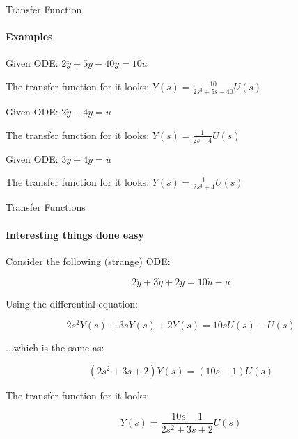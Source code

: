 \documentclass{beamer}
\begin{document}
\begin{frame}{Transfer Function}
\framesubtitle{Examples}
\begin{flushleft}

\begin{example}
Given ODE: $2 \dddot y + 5\dot y - 40 y = 10 u$

The transfer function for it looks: 
$Y(s)  = \frac{10}{2 s^3 + 5 s - 40} U(s)$
\end{example}


\begin{example}
Given ODE: $2 \dot y - 4 y = u$

The transfer function for it looks: $Y(s) = \frac{1}{2 s - 4} U(s)$
\end{example}


\begin{example}
Given ODE: $3 \dddot y + 4y = u$

The transfer function for it looks: $Y(s) = \frac{1}{2 s^3 + 4} U(s)$
\end{example}

\end{flushleft}
\end{frame}




\begin{frame}{Transfer Functions}
\framesubtitle{Interesting things done easy}
\begin{flushleft}

Consider the following (strange) ODE:

\begin{equation}
2 \ddot y + 3 \dot y + 2 y = 10 \dot u - u
\end{equation}

Using the differential equation:

\begin{equation}
2 s^2 Y(s) + 3s Y(s) + 2Y(s) = 10s U(s) - U(s)
\end{equation}

...which is the same as:

\begin{equation}
(2s^2 + 3s + 2) Y(s) = (10s - 1)U(s)
\end{equation}

The transfer function for it looks: 

\begin{equation}
Y(s) = \frac{10s - 1}{2s^2 + 3s + 2} U(s)
\end{equation}

\end{flushleft}
\end{frame}
\end{document}
